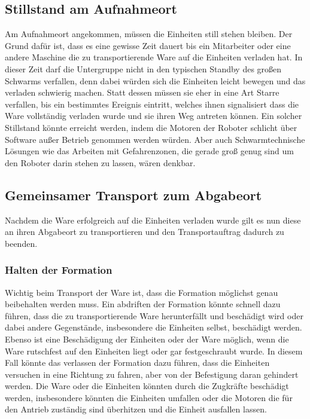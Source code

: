 \subsection*{Stillstand am Aufnahmeort}
Am Aufnahmeort angekommen, müssen die Einheiten still stehen bleiben.
Der Grund dafür ist, dass es eine gewisse Zeit dauert bis ein Mitarbeiter oder eine andere Maschine die zu transportierende Ware auf die Einheiten verladen hat.
In dieser Zeit darf die Untergruppe nicht in den typischen Standby des großen Schwarms verfallen, denn dabei würden sich die Einheiten leicht bewegen und das verladen schwierig machen.
Statt dessen müssen sie eher in eine Art Starre verfallen, bis ein bestimmtes Ereignis eintritt, welches ihnen signalisiert dass die Ware vollständig verladen wurde und sie ihren Weg antreten können.
Ein solcher Stillstand könnte erreicht werden, indem die Motoren der Roboter schlicht über Software außer Betrieb genommen werden würden. Aber auch Schwarmtechnische Lösungen wie das Arbeiten mit Gefahrenzonen, die gerade groß genug sind um den Roboter darin stehen zu lassen, wären denkbar.

\subsection*{Gemeinsamer Transport zum Abgabeort}
Nachdem die Ware erfolgreich auf die Einheiten verladen wurde gilt es nun diese an ihren Abgabeort zu transportieren und den Transportauftrag dadurch zu beenden.

\subsubsection*{Halten der Formation}
Wichtig beim Transport der Ware ist, dass die Formation möglichst genau beibehalten werden muss.
Ein abdriften der Formation könnte schnell dazu führen, dass die zu transportierende Ware herunterfällt und beschädigt wird oder dabei andere Gegenstände, insbesondere die Einheiten selbst, beschädigt werden.
Ebenso ist eine Beschädigung der Einheiten oder der Ware möglich, wenn die Ware rutschfest auf den Einheiten liegt oder gar festgeschraubt wurde.
In diesem Fall könnte das verlassen der Formation dazu führen, dass die Einheiten versuchen in eine Richtung zu fahren, aber von der Befestigung daran gehindert werden.
Die Ware oder die Einheiten könnten durch die Zugkräfte beschädigt werden, insbesondere könnten die Einheiten umfallen oder die Motoren die für den Antrieb zuständig sind überhitzen und die Einheit ausfallen lassen.

